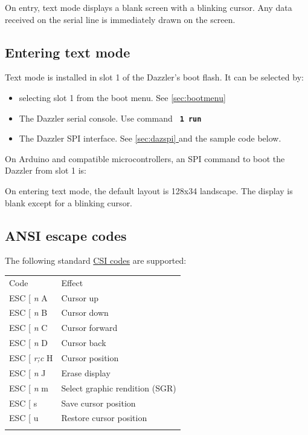\documentclass{article}
\newcommand{\dev}{Dazzler}
\newcommand{\eg}[1]{
\begin{framed}

\end{framed}
}
\newcommand{\heavyline}{\specialrule{1pt}{1pt}{1pt}}
\newcommand*{\fullref}[1]{\hyperref[{#1}]{\autoref*{#1} \nameref*{#1}}} %
\newcommand{\mach}[1]{\texttt{\textbf{#1}}}
\newcommand{\gap}{\vspace{10pt}}
\begin{document}
On entry, text mode displays a blank screen with a blinking cursor. 
Any data received on the serial line is immediately drawn on the screen.

\subsection{Entering text mode}

Text mode is installed in slot 1 of the Dazzler's boot flash.
It can be selected by:

\begin{itemize}

\item selecting slot 1 from the boot menu. See \fullref{sec:bootmenu}

\item The Dazzler serial console. Use command \mach{ 1 run}

\item The Dazzler SPI interface. See \fullref{sec:dazspi} and the sample code below.

\end{itemize}

On Arduino and compatible microcontrollers, an SPI command to boot the \dev{} from slot 1 is:

\newpage
\eg{textmode}

On entering text mode, the default layout is 128x34 landscape. The display is blank except for a blinking cursor.

\subsection{ANSI escape codes}

The following standard
\href{https://en.wikipedia.org/wiki/ANSI_escape_code\#CSI_sequences}{CSI codes}
are supported:

\gap\noindent
\begin{tabularx}{\linewidth}{lX}
\heavyline
Code & Effect \\ \heavyline

ESC {[} \emph{n} A & Cursor up \\

ESC {[} \emph{n} B & Cursor down \\

ESC {[} \emph{n} C & Cursor forward \\

ESC {[} \emph{n} D & Cursor back \\

ESC {[} \emph{r;c} H & Cursor position \\

ESC {[} \emph{n} J & Erase display \\

ESC {[} \emph{n} m & Select graphic rendition (SGR)\\

ESC {[} s & Save cursor position \\

ESC {[} u & Restore cursor position \\ \heavyline
\end{tabularx}
\gap
\end{document}
